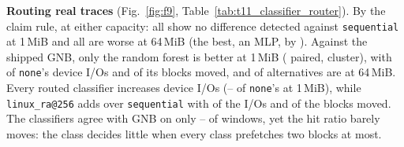 \textbf{Routing real traces} (Fig.~\ref{fig:f9},
Table~\ref{tab:t11_classifier_router}). By the claim rule,
\decClfClaimBeatsReadAheadOneMiBVerdict{} at either capacity: all
\decTallyClfOneOneMiB{} show no difference detected against
\texttt{sequential} at 1\,MiB and all are worse at 64\,MiB (the best, an MLP,
by \decClfOneMlpSixtyFourMiBPairedCI). Against the shipped GNB, only the random
forest is better at 1\,MiB (\decClfTwoRfOneMiBPairedCI{} paired,
\decClfTwoRfOneMiBClusterCI{} cluster), with \decClfThreeRfOneMiBPairedCI{}
of \texttt{none}'s device I/Os and \decClfFourRfOneMiBPaired{} of its blocks
moved, and \decTallyClfTwoSixtyFourMiBBetter{}
of \decTallyClfTwoSixtyFourMiB{} alternatives are at 64\,MiB. Every routed
classifier increases device I/Os (\clfRouterIORatioMinOneMiB--\clfRouterIORatioMaxOneMiB{}
of \texttt{none}'s at 1\,MiB), while \texttt{linux\_ra@256} adds
\decClfOneLinuxRaAtTwoHundredFiftySixOneMiBPaired{} over \texttt{sequential}
with \clfRouterIORatioLinuxRaAtTwoHundredFiftySixOneMiB{} of the I/Os and
\decClfFourLinuxRaAtTwoHundredFiftySixOneMiBPaired{} of the blocks moved. The
classifiers agree with GNB on only \clfRouterAgreementMin--\clfRouterAgreementMax{}
of windows, yet the hit ratio barely moves: the class decides little when
every class prefetches two blocks at most.

